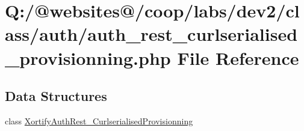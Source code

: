 \hypertarget{auth__rest__curlserialised__provisionning_8php}{\section{Q\-:/@websites@/coop/labs/dev2/class/auth/auth\-\_\-rest\-\_\-curlserialised\-\_\-provisionning.php File Reference}
\label{auth__rest__curlserialised__provisionning_8php}
}
\subsection*{Data Structures}
\begin{DoxyCompactItemize}
\item 
class \hyperlink{class_xortify_auth_rest___curlserialised_provisionning}{Xortify\-Auth\-Rest\-\_\-\-Curlserialised\-Provisionning}
\end{DoxyCompactItemize}
